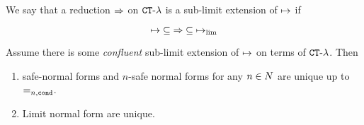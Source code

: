 We say that a reduction ${\Rightarrow}$ on ${ {\tt CT} \mbox{-} \lambda}$ 
is a sub-limit extension of $\mathbin{\mapsto}$ if

$$
\mathbin{\mapsto} \subseteq {\Rightarrow} \subseteq \mathbin{\mapsto}_{\lim}
$$ 

\begin{lemma}
Assume there is some \emph{confluent} sub-limit extension of $\mathbin{\mapsto}$ on terms of ${ {\tt CT} \mbox{-} \lambda}$.
Then 
\begin{enumerate}
\item
safe-normal forms and $n$-safe normal forms for any $n \in {N}$ are unique up to $=_{n,{\tt cond}}$.
\item
Limit normal form are unique.
\end{enumerate}
\end{lemma}

